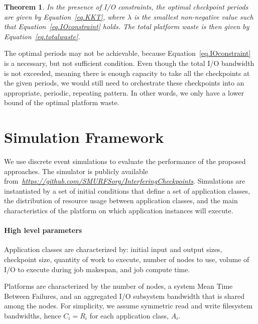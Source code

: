 \documentclass[conference,nofonttune]{IEEEtran}
\newtheorem{theorem}{Theorem}
\newcommand{\app}[1]{A_{#1}}
\newcommand{\ckpt}[1]{C_{#1}}
\newcommand{\reco}[1]{R_{#1}}
\begin{document}
\begin{theorem}
     In the presence of I/O constraints, the optimal checkpoint periods are given by
     Equation~\eqref{eq.KKT}, where $\lambda$ is the smallest non-negative value such
     that Equation~\eqref{eq.IOconstraint} holds. The total platform waste is then
     given by Equation~\eqref{eq.totalwaste}.
\end{theorem}

The optimal periods may not be achievable, because
Equation~\eqref{eq.IOconstraint} is a necessary, but not sufficient condition.
Even though the total I/O bandwidth is not exceeded, meaning there is enough
capacity to take all the checkpoints at the given periods, we would still need
to orchestrate these checkpoints into an appropriate, periodic, repeating
pattern.  In other words, we only have a lower bound of the optimal platform
waste.

%

\section{Simulation Framework}
\label{sec:simulator}

We use discrete event simulations to evaluate the performance of the proposed
approaches. The simulator is publicly available
from~\textit{\url{https://github.com/SMURFSorg/InterferingCheckpoints}}. Simulations are instantiated
by a set of initial conditions that define a set of application classes, the
distribution of resource usage between application classes, and the main
characteristics of the platform on which application instances will execute.

\paragraph*{High level parameters}
Application classes are characterized by: initial input and output sizes, checkpoint
size, quantity of work to execute, number of nodes to use, volume of I/O to
execute during job makespan, and job compute time.

Platforms are characterized by the number of nodes, a system Mean Time
Between Failures, and an aggregated I/O subsystem bandwidth that is shared among the
nodes. For simplicity, we assume symmetric read and write filesystem bandwidths, hence
$\ckpt{i}=\reco{i}$ for each application class, $\app{i}$.
\end{document}
